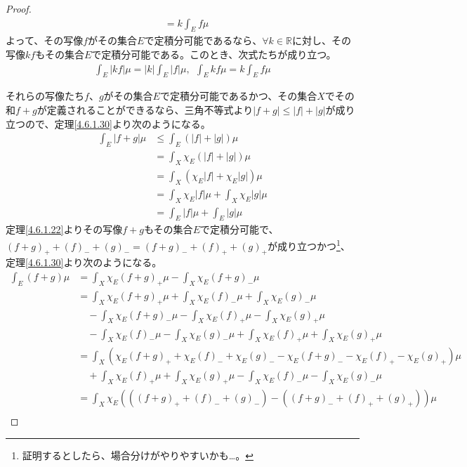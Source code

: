 \documentclass[dvipdfmx]{jsarticle}
\begin{document}
\begin{proof}
\begin{align*}
&= k\int_{E} {f\mu}
\end{align*}
よって、その写像$f$がその集合$E$で定積分可能であるなら、$\forall k \in \mathbb{R}$に対し、その写像$kf$もその集合$E$で定積分可能である。このとき、次式たちが成り立つ。
\begin{align*}
\int_{E} {|kf|\mu} = |k|\int_{E} {|f|\mu},\ \ \int_{E} {kf\mu} = k\int_{E} {f\mu}
\end{align*}\par
それらの写像たち$f$、$g$がその集合$E$で定積分可能であるかつ、その集合$X$でその和$f + g$が定義されることができるなら、三角不等式より$|f + g| \leq |f| + |g|$が成り立つので、定理\ref{4.6.1.30}より次のようになる。
\begin{align*}
\int_{E} {|f + g|\mu} &\leq \int_{E} {\left( |f| + |g| \right)\mu}\\
&= \int_{X} {\chi_{E}\left( |f| + |g| \right)\mu}\\
&= \int_{X} {\left( \chi_{E}|f| + \chi_{E}|g| \right)\mu}\\
&= \int_{X} {\chi_{E}|f|\mu} + \int_{X} {\chi_{E}|g|\mu}\\
&= \int_{E} {|f|\mu} + \int_{E} {|g|\mu}
\end{align*}
定理\ref{4.6.1.22}よりその写像$f + g$もその集合$E$で定積分可能で、$(f + g)_{+} + (f)_{-} + (g)_{-} = (f + g)_{-} + (f)_{+} + (g)_{+}$が成り立つかつ\footnote{証明するとしたら、場合分けがやりやすいかも…。}、定理\ref{4.6.1.30}より次のようになる。
\begin{align*}
\int_{E} {(f + g)\mu} &= \int_{X} {\chi_{E}(f + g)_{+}\mu} - \int_{X} {\chi_{E}(f + g)_{-}\mu}\\
&= \int_{X} {\chi_{E}(f + g)_{+}\mu} + \int_{X} {\chi_{E}(f)_{-}\mu} + \int_{X} {\chi_{E}(g)_{-}\mu} \\
&\quad - \int_{X} {\chi_{E}(f + g)_{-}\mu} - \int_{X} {\chi_{E}(f)_{+}\mu} - \int_{X} {\chi_{E}(g)_{+}\mu} \\
&\quad - \int_{X} {\chi_{E}(f)_{-}\mu} - \int_{X} {\chi_{E}(g)_{-}\mu} + \int_{X} {\chi_{E}(f)_{+}\mu} + \int_{X} {\chi_{E}(g)_{+}\mu}\\
&= \int_{X} \left( \chi_{E}(f + g)_{+} + \chi_{E}(f)_{-} + \chi_{E}(g)_{-} - \chi_{E}(f + g)_{-} - \chi_{E}(f)_{+} - \chi_{E}(g)_{+} \right)\mu \\
&\quad + \int_{X} {\chi_{E}(f)_{+}\mu} + \int_{X} {\chi_{E}(g)_{+}\mu} - \int_{X} {\chi_{E}(f)_{-}\mu} - \int_{X} {\chi_{E}(g)_{-}\mu}\\
&= \int_{X} \chi_{E}\left( \left( (f + g)_{+} + (f)_{-} + (g)_{-} \right) - \left( (f + g)_{-} + (f)_{+} + (g)_{+} \right) \right)\mu \\

\end{align*}
\end{proof}
\end{document}

